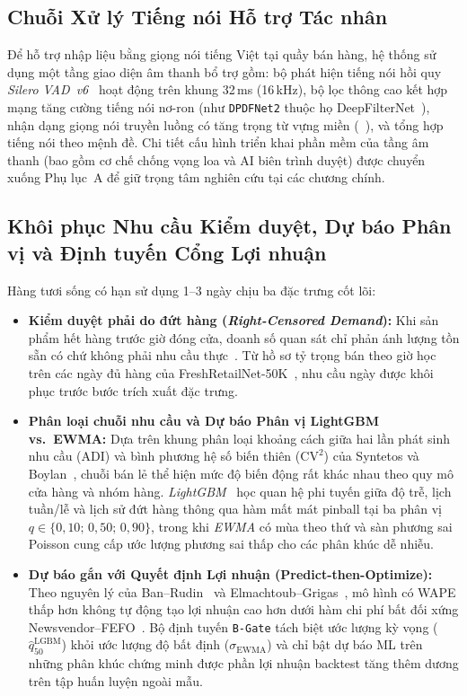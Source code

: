\subsection*{Chuỗi Xử lý Tiếng nói Hỗ trợ Tác nhân}
Để hỗ trợ nhập liệu bằng giọng nói tiếng Việt tại quầy bán hàng, hệ thống sử dụng một tầng giao diện âm thanh bổ trợ gồm: bộ phát hiện tiếng nói hồi quy \emph{Silero VAD~v6}~\cite{silero_vad} hoạt động trên khung 32\,ms (16\,kHz), bộ lọc thông cao kết hợp mạng tăng cường tiếng nói nơ-ron (như \texttt{DPDFNet2} thuộc họ DeepFilterNet~\cite{schroter2022deepfilternet,sherpa_onnx}), nhận dạng giọng nói truyền luồng có tăng trọng từ vựng miền (~\cite{azure_speech}), và tổng hợp tiếng nói theo mệnh đề. Chi tiết cấu hình triển khai phần mềm của tầng âm thanh (bao gồm cơ chế chống vọng loa và AI biên trình duyệt) được chuyển xuống Phụ lục~A để giữ trọng tâm nghiên cứu tại các chương chính.

\subsection*{Khôi phục Nhu cầu Kiểm duyệt, Dự báo Phân vị và Định tuyến Cổng Lợi nhuận}
Hàng tươi sống có hạn sử dụng 1--3 ngày chịu ba đặc trưng cốt lõi:
\begin{itemize}
    \item \textbf{Kiểm duyệt phải do đứt hàng (\emph{Right-Censored Demand}):} Khi sản phẩm hết hàng trước giờ đóng cửa, doanh số quan sát chỉ phản ánh lượng tồn sẵn có chứ không phải nhu cầu thực~\cite{wecker1978stockouts,vulcano2012primary}. Từ hồ sơ tỷ trọng bán theo giờ học trên các ngày đủ hàng của FreshRetailNet-50K~\cite{freshretailnet50k}, nhu cầu ngày được khôi phục trước bước trích xuất đặc trưng.
    \item \textbf{Phân loại chuỗi nhu cầu và Dự báo Phân vị LightGBM vs.\ EWMA:} Dựa trên khung phân loại khoảng cách giữa hai lần phát sinh nhu cầu (ADI) và bình phương hệ số biến thiên ($\text{CV}^2$) của Syntetos và Boylan~\cite{syntetos2005intermittent}, chuỗi bán lẻ thể hiện mức độ biến động rất khác nhau theo quy mô cửa hàng và nhóm hàng. \emph{LightGBM}~\cite{ke2017lightgbm} học quan hệ phi tuyến giữa độ trễ, lịch tuần/lễ và lịch sử đứt hàng thông qua hàm mất mát pinball tại ba phân vị $q \in \{0{,}10;\,0{,}50;\,0{,}90\}$, trong khi \emph{EWMA} có mùa theo thứ và sàn phương sai Poisson cung cấp ước lượng phương sai thấp cho các phân khúc dễ nhiễu.
    \item \textbf{Dự báo gắn với Quyết định Lợi nhuận (Predict-then-Optimize):} Theo nguyên lý của Ban--Rudin~\cite{ban2019bigdata} và Elmachtoub--Grigas~\cite{elmachtoub2022spo}, mô hình có WAPE thấp hơn không tự động tạo lợi nhuận cao hơn dưới hàm chi phí bất đối xứng Newsvendor--FEFO~\cite{nahmias2011perishable,silver2017inventory}. Bộ định tuyến \texttt{B-Gate} tách biệt ước lượng kỳ vọng ($\hat{q}_{50}^{\text{LGBM}}$) khỏi ước lượng độ bất định ($\sigma_{\text{EWMA}}$) và chỉ bật dự báo ML trên những phân khúc chứng minh được phần lợi nhuận backtest tăng thêm dương trên tập huấn luyện ngoài mẫu.
\end{itemize}

